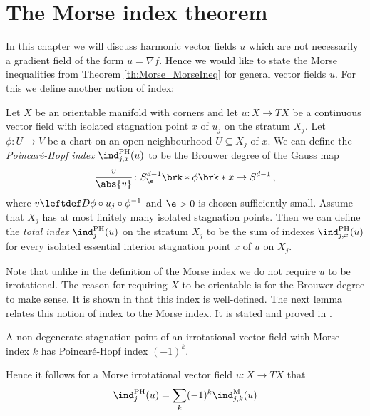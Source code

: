 
\section{The Morse index theorem}

In this chapter we will discuss harmonic vector fields $u$ which are not necessarily a
gradient field of the form $u=\nabla f$. Hence we would like to state the Morse inequalities from Theorem \ref{th:Morse_MorseIneq}
for general vector fields $u$.
For this we define another notion of index:
\begin{definition}
  \label{df:poincareHopf_index}
  Let $X$ be an orientable manifold with corners and let $u\colon X\to TX$ be a continuous vector field
  with isolated stagnation point $x$ of $u_j$ on the stratum $X_j$.
  Let $\phi\colon U\to V$ be a chart on an open neighbourhood $U\subseteq X_j$ of $x$.
  We can define the
  \emph{Poincaré-Hopf index} $\ind^{\text{PH}}_{j,x}(u)$ to be the Brouwer degree of the Gauss map
  \begin{align*}
    \frac{v}{\abs{v}}\colon S^{d-1}_\e\brk*{\phi\brk*{x}}\to S^{d-1}\,,
  \end{align*}
  where $v\leftdef D\phi\circ u_j\circ \phi^{-1}$ and $\e>0$ is chosen sufficiently small.
  Assume that $X_j$ has at most finitely many isolated stagnation points.
  Then we can define the
   \emph{total index} $\ind^{\text{PH}}_{j}(u)$ on the stratum $X_j$ to be the sum of indexes $\ind^{\text{PH}}_{j,x}(u)$
  for every isolated essential interior stagnation point $x$ of $u$ on $X_j$.
\end{definition}
Note that unlike in the definition of the Morse index we do not require $u$ to be irrotational.
The reason for requiring $X$ to be orientable is for the Brouwer degree to make sense.
It is shown in \cite[§6, Lemma 1]{Milnor1965} that this index is well-defined.
The next lemma relates this notion of index to the Morse index.
It is stated and proved in \cite[§6, Lemma 4]{Milnor1965}.
\begin{lemma}
  A non-degenerate stagnation point of an irrotational vector field
  with Morse index $k$ has Poincaré-Hopf index $(-1)^k$.
\end{lemma}
Hence it follows for a Morse irrotational vector field $u\colon X\to TX$ that
\begin{align*}
  \ind^{\text{PH}}_j(u)=\sum_k(-1)^k\ind^\text{M}_{j,k}(u)
\end{align*}
